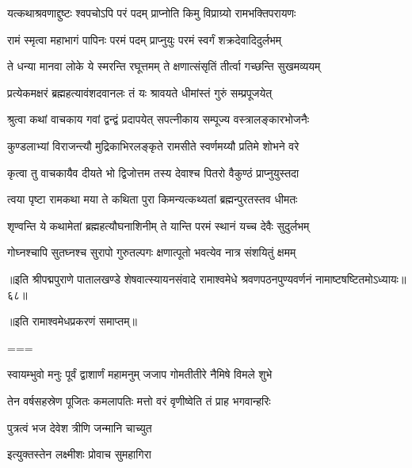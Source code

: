 \twolineshloka
{यत्कथाश्रवणाद्दुष्टः श्वपचोऽपि परं पदम्}
{प्राप्नोति किमु विप्राग्र्यो रामभक्तिपरायणः}%

\twolineshloka
{रामं स्मृत्वा महाभागं पापिनः परमं पदम्}
{प्राप्नुयुः परमं स्वर्गं शक्रदेवादिदुर्लभम्}%

\twolineshloka
{ते धन्या मानवा लोके ये स्मरन्ति रघूत्तमम्}
{ते क्षणात्संसृतिं तीर्त्वा गच्छन्ति सुखमव्ययम्}%

\twolineshloka
{प्रत्येकमक्षरं ब्रह्महत्यावंशदवानलः}
{तं यः श्रावयते धीमांस्तं गुरुं सम्प्रपूजयेत्}%

\twolineshloka
{श्रुत्वा कथां वाचकाय गवां द्वन्द्वं प्रदापयेत्}
{सपत्नीकाय सम्पूज्य वस्त्रालङ्कारभोजनैः}%

\twolineshloka
{कुण्डलाभ्यां विराजन्त्यौ मुद्रिकाभिरलङ्कृते}
{रामसीते स्वर्णमय्यौ प्रतिमे शोभने वरे}%

\twolineshloka
{कृत्वा तु वाचकायैव दीयते भो द्विजोत्तम}
{तस्य देवाश्च पितरो वैकुण्ठं प्राप्नुयुस्तदा}%

\twolineshloka
{त्वया पृष्टा रामकथा मया ते कथिता पुरा}
{किमन्यत्कथ्यतां ब्रह्मन्पुरतस्तव धीमतः}%

\twolineshloka
{शृण्वन्ति ये कथामेतां ब्रह्महत्यौघनाशिनीम्}
{ते यान्ति परमं स्थानं यच्च देवैः सुदुर्लभम्}%

\twolineshloka
{गोघ्नश्चापि सुतघ्नश्च सुरापो गुरुतल्पगः}
{क्षणात्पूतो भवत्येव नात्र संशयितुं क्षमम्}%

{॥इति श्रीपद्मपुराणे पातालखण्डे शेषवात्स्यायनसंवादे रामाश्वमेधे श्रवणपठनपुण्यवर्णनं नामाष्टषष्टितमोऽध्यायः॥६८॥}

{॥इति रामाश्वमेधप्रकरणं समाप्तम्॥}

===



\twolineshloka
{स्वायम्भुवो मनुः पूर्वं द्वाशार्णं महामनुम्}
{जजाप गोमतीतीरे नैमिषे विमले शुभे}%

\twolineshloka
{तेन वर्षसहस्रेण पूजितः कमलापतिः}
{मत्तो वरं वृणीष्वेति तं प्राह भगवान्हरिः}%


\onelineshloka
{पुत्रत्वं भज देवेश त्रीणि जन्मानि चाच्युत}%


\onelineshloka
{इत्युक्तस्तेन लक्ष्मीशः प्रोवाच सुमहागिरा}%

